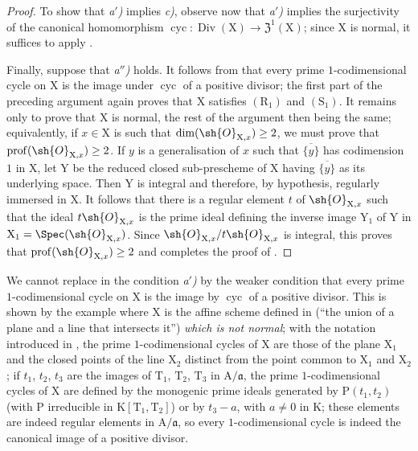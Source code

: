 \begin{proof}
To show that \emph{a$'$)} implies \emph{c)}, observe now that \emph{a$'$)} implies the surjectivity of the canonical homomorphism $\operatorname{cyc}:\operatorname{Div}(\mathrm{X})\to\mathfrak{Z}^1(\mathrm{X})$; since $\mathrm{X}$ is normal, it suffices to apply .

Finally, suppose that \emph{a$''$)} holds.
It follows from  that every prime $1$-codimensional cycle on $\mathrm{X}$ is the image under $\operatorname{cyc}$ of a positive divisor; the first part of the preceding argument again proves that $\mathrm{X}$ satisfies $(\mathrm{R}_1)$ and $(\mathrm{S}_1)$.
It remains only to prove that $\mathrm{X}$ is normal, the rest of the argument then being the same; equivalently, if $x\in\mathrm{X}$ is such that $\dim(\sh{O}_{\mathrm{X},x})\geq 2$, we must prove that $\operatorname{prof}(\sh{O}_{\mathrm{X},x})\geq 2$.
If $y$ is a generalisation of $x$ such that $\overline{\{y\}}$ has codimension $1$ in $\mathrm{X}$, let $\mathrm{Y}$ be the reduced closed sub-prescheme of $\mathrm{X}$ having $\overline{\{y\}}$ as its
underlying space.
Then $\mathrm{Y}$ is integral and therefore, by hypothesis, regularly immersed in $\mathrm{X}$.
It follows that there is a regular element $t$ of $\sh{O}_{\mathrm{X},x}$ such that the ideal $t\sh{O}_{\mathrm{X},x}$ is the prime ideal defining the inverse image $\mathrm{Y}_1$ of $\mathrm{Y}$ in $\mathrm{X}_1=\Spec(\sh{O}_{\mathrm{X},x})$.
Since $\sh{O}_{\mathrm{X},x}/t\sh{O}_{\mathrm{X},x}$ is integral, this proves that $\operatorname{prof}(\sh{O}_{\mathrm{X},x})\geq 2$ and completes the proof of .
\end{proof}

\begin{remark}[21.7.5]
\label{IV.21.7.5}
We cannot replace in  the condition \emph{a$'$)} by the weaker condition that every prime $1$-codimensional cycle on $\mathrm{X}$ is the image by $\operatorname{cyc}$ of a positive divisor.
This is shown by the example where $\mathrm{X}$ is the affine scheme defined in  (``the union of a plane and a line that intersects it'') \emph{which is not normal};
with the notation introduced in , the prime $1$-codimensional cycles of $\mathrm{X}$ are those of the plane $\mathrm{X}_1$ and the closed points of the line $\mathrm{X}_2$ distinct from the point common to $\mathrm{X}_1$ and $\mathrm{X}_2$;
if $t_1$, $t_2$, $t_3$ are the images of $\mathrm{T}_1$, $\mathrm{T}_2$, $\mathrm{T}_3$ in $\mathrm{A}/\mathfrak{a}$, the prime $1$-codimensional cycles of $\mathrm{X}$ are defined by the monogenic prime ideals generated by $\mathrm{P}(t_1,t_2)$ (with $\mathrm{P}$ irreducible in $\mathrm{K}[\mathrm{T}_1,\mathrm{T}_2]$) or by $t_3-a$, with $a\neq 0$ in $\mathrm{K}$;
these elements are indeed regular elements in $\mathrm{A}/\mathfrak{a}$, so every $1$-codimensional cycle is indeed the canonical image of a positive divisor.
\end{remark}

